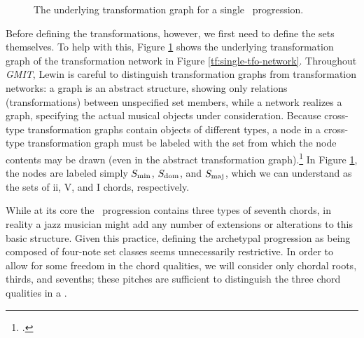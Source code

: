 \begin{figure}[htbp]
  \caption{The underlying transformation graph for a single \tfo\ progression.}
  \label{tf:single-tfo-graph}
\end{figure}

Before defining the transformations, however, we first need to define the sets
themselves. To help with this, Figure \ref{tf:single-tfo-graph} shows the
underlying transformation graph of the transformation network in Figure
\ref{tf:single-tfo-network}. Throughout \emph{GMIT}, Lewin is careful to
distinguish transformation graphs from transformation networks: a graph is an
abstract structure, showing only relations (transformations) between
unspecified set members, while a network realizes a graph, specifying the
actual musical objects under consideration. Because cross-type
transformation graphs contain objects of different types, a node in a
cross-type transformation graph must be labeled with the set from which the
node contents may be drawn (even in the abstract transformation
graph).\footcite[7]{hook:2007} In Figure \ref{tf:single-tfo-graph}, the nodes
are labeled simply $S_{\mathrm{min}}$, $S_{\mathrm{dom}}$, and $S_{\mathrm{maj}}$, which we can understand as the
sets of ii, V, and I chords, respectively.

While at its core the \tfo\ progression contains three types of seventh
chords, in reality a jazz musician might add any number of extensions or
alterations to this basic structure. Given this practice, defining the
archetypal progression as being composed of four-note set classes seems
unnecessarily restrictive. In order to allow for some freedom in the chord
qualities, we will consider only chordal roots, thirds, and sevenths; these
pitches are sufficient to distinguish the three chord qualities in a \tfo.

